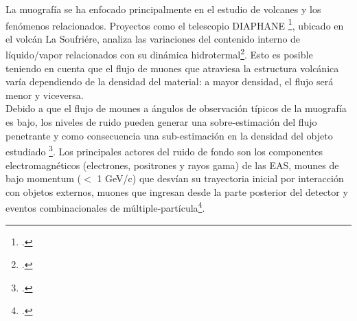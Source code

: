 


La muografía se ha enfocado principalmente en el estudio de volcanes y los  fenómenos relacionados. Proyectos como el telescopio DIAPHANE \footcite{marteau2017diaphane}, ubicado en el volcán La Soufriére, analiza las variaciones del contenido interno de líquido/vapor relacionados con su dinámica  hidrotermal\footcite{gomez2017forward}. Esto es posible teniendo en cuenta que el flujo de muones que atraviesa la estructura volcánica varía dependiendo de la densidad del material: a mayor densidad, el flujo será menor y viceversa.\\


Debido a que el flujo de mounes a ángulos de observación típicos de la muografía es bajo, los niveles de ruido pueden generar una sobre-estimación del flujo penetrante y como consecuencia una sub-estimación en la densidad del objeto estudiado \footcite{kusagaya2015muographic}. Los principales actores del ruido de fondo son los componentes electromagnéticos (electrones, positrones y rayos gama) de las EAS, mounes de bajo momentum ($<$ 1 GeV/c) que desvían su trayectoria inicial por interacción con objetos externos, muones que ingresan desde la parte posterior del detector y eventos combinacionales de múltiple-partícula\footcite{nishiyama2014experimental}.\\

